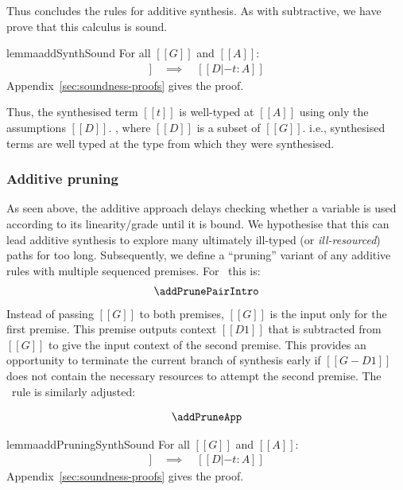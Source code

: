   Thus concludes the rules for additive synthesis. As with subtractive, we
  have prove that this calculus is sound.
  \begin{restatable}{lemma}{addSynthSound}
\label{lemma:addSynthSound} For all $[[ G ]]$ and $[[ A ]]$:
%
\begin{align*}
[[ G |- A =>+ t ; D ]] \quad \implies \quad [[ D |- t : A ]]
\end{align*}
Appendix~\ref{sec:soundness-proofs} gives the proof.
\end{restatable}
Thus, the synthesised term $[[ t ]]$ is well-typed
at $[[ A ]]$ using only the assumptions $[[ D ]]$.
, where $[[D]]$ is a
subset of $[[G]]$.
i.e., synthesised terms are well typed at the type from which they
were synthesised.

\subsubsection{Additive pruning}
%
As seen above, the additive approach delays checking
whether a variable is used according to its linearity/grade
until it is bound. We hypothesise that this can lead additive synthesis to explore
many ultimately ill-typed (or \emph{ill-resourced})
paths for too long. Subsequently, we define a ``pruning''
variant of any additive rules with multiple sequenced
premises. For \addPairIntroName\ this is:
%
\begin{align*}
  \begin{array}{c}
    \addPrunePairIntro
  \end{array}
\end{align*}
%
Instead of passing $[[G]]$ to both
premises, $[[G]]$ is the input only for
the first premise. This premise outputs context $[[D1]]$ that
is subtracted from $[[G]]$ to give the input context
of the second premise. This provides an opportunity to
terminate the current branch of synthesis early if $[[ G - D1
]]$ does not contain the necessary resources to attempt the
second premise.
The \addAppName\ rule is similarly adjusted:

\begin{align*}
  \begin{array}{c}
    \addPruneApp
  \end{array}
\end{align*}

\begin{restatable}{lemma}{addPruningSynthSound}
\label{lemma:addPruningSynthSound} For all $[[ G ]]$ and $[[ A ]]$:
%
\begin{align*}
[[ G |- A =>+ t ; D ]] \quad \implies \quad [[ D |- t : A ]]
\end{align*}
Appendix~\ref{sec:soundness-proofs} gives the proof.
\end{restatable}